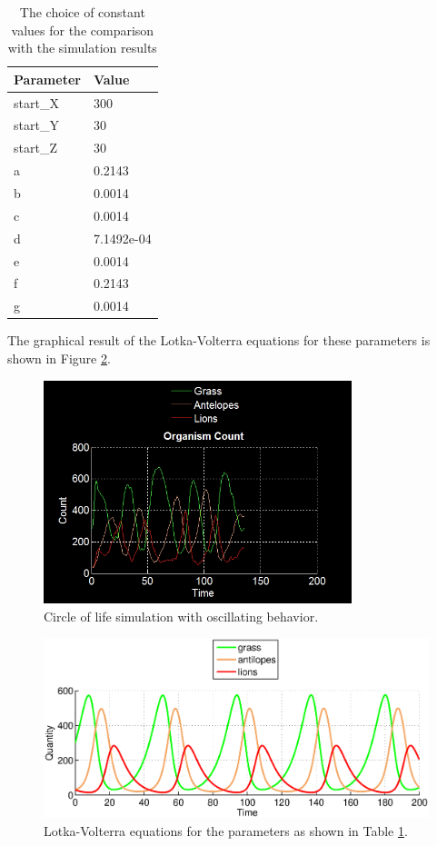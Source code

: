 \documentclass[11pt]{article}
\begin{document}
\begin{table}[htbp]
\centering
\begin{tabular}{l|l}
Parameter & Value \\ 
\hline 
\hline
start\_X & 300\\
\hline
start\_Y & 30\\
\hline
start\_Z & 30\\
\hline
a & 0.2143\\ 
\hline 
b & 0.0014\\ 
\hline 
c & 0.0014\\  
\hline 
d & 7.1492e-04\\
\hline 
e & 0.0014\\
\hline 
f & 0.2143\\
\hline 
g & 0.0014\\
\end{tabular}
\caption{The choice of constant values for the comparison with the simulation results}
\label{tab:LotkaVolterraParametersFinal}
\end{table}

The graphical result of the Lotka-Volterra equations for these parameters is shown in Figure \ref{fig:LotkaVolterraThreeAdjusted}.



\begin{figure}
\centering
\includegraphics[width=0.8\textwidth]{circleOfLifeOscillating.png}
\caption{Circle of life simulation with oscillating behavior.}
\label{fig:noGrass}
\end{figure}
\begin{figure}
\centering
\includegraphics[scale=0.7]{LotkaVolterraThreeAdjusted}
\caption{Lotka-Volterra equations for the parameters as shown in Table \ref{tab:LotkaVolterraParametersFinal}.}
\label{fig:LotkaVolterraThreeAdjusted}
\end{figure}
\end{document}
